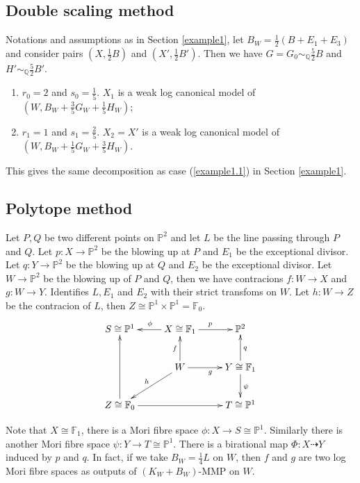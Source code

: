 \documentclass[11pt]{amsart}
\begin{document}
\subsection{Double scaling method}
Notations and assumptions as in Section \ref{example1}, let $B_{W}=\frac{1}{2}(B+E_{1}+E_{3})$ and consider pairs $(X,\frac{1}{2}B)$ and $(X',\frac{1}{2}B')$. Then we have $G=G_{0}\sim_{\mathbb{Q}}\frac{5}{2}B$ and $H'\sim_{\mathbb{Q}}\frac{5}{2}B'$.

\begin{enumerate}
  \item $r_{0}=2$ and $s_{0}=\frac{1}{5}$. $X_{1}$ is a weak log canonical model of $(W,B_{W}+\frac{3}{5}G_{W}+\frac{1}{5}H_{W})$;
  \item  $r_{1}=1$ and $s_{1}=\frac{2}{5}$. $X_{2}= X'$ is a weak log canonical model of $(W,B_{W}+\frac{1}{5}G_{W}+\frac{3}{5}H_{W})$.
\end{enumerate} 

This gives the same decomposition as case (\ref{example1.1}) in  Section \ref{example1}.

\subsection{Polytope method}
Let  $P,Q$ be two different points on $\mathbb{P}^{2}$ and let $L$ be the line passing through $P$ and $Q$. Let $p:X\to \mathbb{P}^{2}$ be the blowing up at $P$ and $E_{1}$ be the exceptional divisor. Let $q:Y\to \mathbb{P}^{2}$ be the blowing up at $Q$ and $E_{2}$ be the exceptional divisor. Let $W\to \mathbb{P}^{2}$ be the blowing up of $P$ and $Q$, then we have contracions $f:W\to X$ and $g:W\to Y$. Identifies $L,E_{1}$ and $E_{2}$ with their strict transfoms on  $W$. Let $h:W\to Z$ be the contracion of $L$, then $Z\cong \mathbb{P}^{1} \times \mathbb{P}^{1}=\mathbb{F}_{0}$.
\[
  \xymatrix{
    S\cong \mathbb{P}^{1}&X\cong \mathbb{F}_{1}\ar[l]_{\phi}\ar[r]^{p} & \mathbb{P}^{2} \\
                         &W\ar[u]^{f}\ar[r]_{g}\ar[ld]_{h} & Y\cong \mathbb{F}_{1}\ar[u]_{q}\ar[d]^{\psi}\\
    Z\cong \mathbb{F}_{0}\ar[uu]\ar[rr]&&T\cong \mathbb{P}^{1}
  }
\]

Note that $X\cong \mathbb{F}_{1}$, there is a  Mori fibre space $\phi:X\to S \cong \mathbb{P}^{1}$. Similarly there is another Mori fibre space $\psi:Y\to T\cong \mathbb{P}^{1}$. There is a birational map $\Phi:X\dashrightarrow  Y$ induced by $p$ and $q$. In fact, if we take $B_{W}=\frac{1}{4}L$ on $W$, then $f$ and $g$ are two log Mori fibre spaces as outputs of $(K_{W}+B_{W})$-MMP on $W$.
\end{document}

